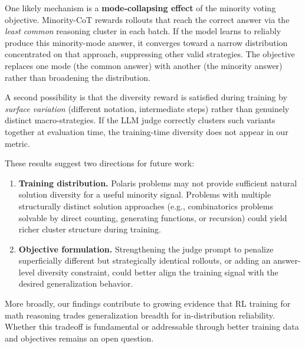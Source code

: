 \documentclass[11pt]{article}
\begin{document}
One likely mechanism is a \textbf{mode-collapsing effect} of the minority
voting objective. Minority-CoT rewards rollouts that reach the correct answer
via the \emph{least common} reasoning cluster in each batch. If the model learns
to reliably produce this minority-mode answer, it converges toward a narrow
distribution concentrated on that approach, suppressing other valid strategies.
The objective replaces one mode (the common answer) with another (the minority
answer) rather than broadening the distribution.

A second possibility is that the diversity reward is satisfied during training
by \emph{surface variation} (different notation, intermediate steps) rather than
genuinely distinct macro-strategies. If the LLM judge correctly clusters such
variants together at evaluation time, the training-time diversity does not
appear in our metric.

These results suggest two directions for future work:

\begin{enumerate}[leftmargin=*, label=\arabic*.]

\item \textbf{Training distribution.}
Polaris problems may not provide sufficient natural solution diversity for a
useful minority signal. Problems with multiple structurally distinct solution
approaches (e.g., combinatorics problems solvable by direct counting, generating
functions, or recursion) could yield richer cluster structure during training.

\item \textbf{Objective formulation.}
Strengthening the judge prompt to penalize superficially different but
strategically identical rollouts, or adding an answer-level diversity
constraint, could better align the training signal with the desired
generalization behavior.

\end{enumerate}

More broadly, our findings contribute to growing evidence that RL training for
math reasoning trades generalization breadth for in-distribution reliability.
Whether this tradeoff is fundamental or addressable through better training data
and objectives remains an open question.
\end{document}
